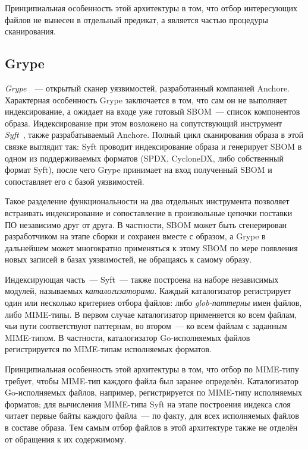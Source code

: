 Принципиальная особенность этой архитектуры в том, что отбор интересующих файлов не вынесен в отдельный предикат, а является частью процедуры сканирования.

\subsection{Grype}

\textit{Grype}~\cite{grype}~--- открытый сканер уязвимостей, разработанный компанией Anchore. Характерная особенность Grype заключается в том, что сам он не выполняет индексирование, а ожидает на входе уже готовый SBOM~--- список компонентов образа. Индексирование при этом возложено на сопутствующий инструмент \textit{Syft}~\cite{syft}, также разрабатываемый Anchore. Полный цикл сканирования образа в этой связке выглядит так: Syft проводит индексирование образа и генерирует SBOM в одном из поддерживаемых форматов (SPDX, CycloneDX, либо собственный формат Syft), после чего Grype принимает на вход полученный SBOM и сопоставляет его с базой уязвимостей.

Такое разделение функциональности на два отдельных инструмента позволяет встраивать индексирование и сопоставление в произвольные цепочки поставки ПО независимо друг от друга. В частности, SBOM может быть сгенерирован разработчиком на этапе сборки и сохранен вместе с образом, а Grype в дальнейшем может многократно применяться к этому SBOM по мере появления новых записей в базах уязвимостей, не обращаясь к самому образу.

Индексирующая часть~--- Syft~--- также построена на наборе независимых модулей, называемых \textit{каталогизаторами}. Каждый каталогизатор регистрирует один или несколько критериев отбора файлов: либо \textit{glob-паттерны} имен файлов, либо MIME-типы. В первом случае каталогизатор применяется ко всем файлам, чьи пути соответствуют паттернам, во втором~--- ко всем файлам с заданным MIME-типом. В частности, каталогизатор Go-исполняемых файлов регистрируется по MIME-типам исполняемых форматов.

Принципиальная особенность этой архитектуры в том, что отбор по MIME-типу требует, чтобы MIME-тип каждого файла был заранее определён. Каталогизатор Go-исполняемых файлов, например, регистрируется по MIME-типу исполняемых форматов; для вычисления MIME-типа Syft на этапе построения индекса слоя читает первые байты каждого файла~--- по факту, для всех исполняемых файлов в составе образа. Тем самым отбор файлов в этой архитектуре также не отделён от обращения к их содержимому.

